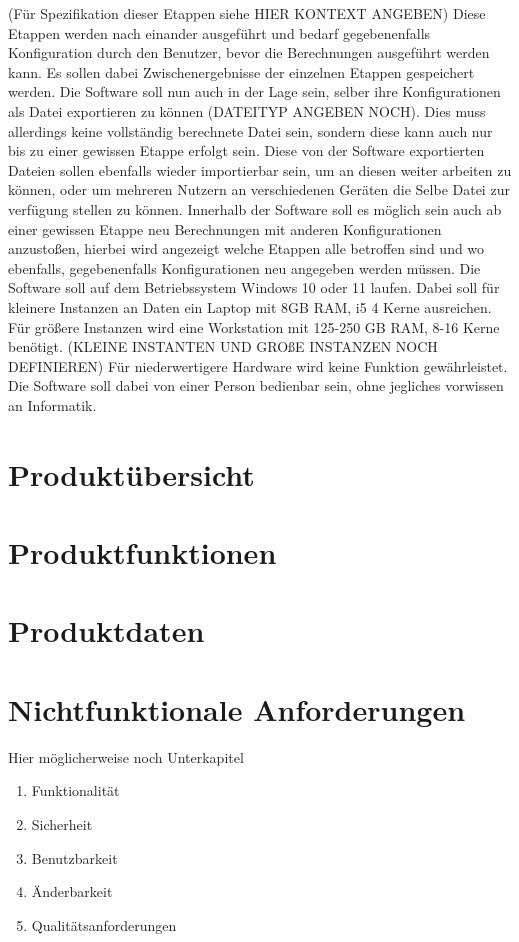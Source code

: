 \documentclass[parskip=full]{scrartcl} %
\begin{document}
(Für Spezifikation dieser Etappen siehe HIER KONTEXT ANGEBEN)
Diese Etappen werden nach einander ausgeführt und bedarf gegebenenfalls Konfiguration durch den Benutzer, bevor die Berechnungen ausgeführt werden kann.
Es sollen dabei Zwischenergebnisse der einzelnen Etappen gespeichert werden.
Die Software soll nun auch in der Lage sein, selber ihre Konfigurationen als Datei exportieren zu können (DATEITYP ANGEBEN NOCH). Dies muss allerdings keine vollständig berechnete Datei sein, sondern diese kann auch nur bis zu einer gewissen Etappe erfolgt sein.
Diese von der Software exportierten Dateien sollen ebenfalls wieder importierbar sein, um an diesen weiter arbeiten zu können, oder um mehreren Nutzern an verschiedenen Geräten die Selbe Datei zur verfügung stellen zu können.
Innerhalb der Software soll es möglich sein auch ab einer gewissen Etappe neu Berechnungen mit anderen Konfigurationen anzustoßen, hierbei wird angezeigt welche Etappen alle betroffen sind und wo ebenfalls, gegebenenfalls Konfigurationen neu angegeben werden müssen.
Die Software soll auf dem Betriebssystem Windows 10 oder 11 laufen.
Dabei soll für kleinere Instanzen an Daten ein Laptop mit 8GB RAM, i5 4 Kerne ausreichen.
Für größere Instanzen wird eine Workstation mit 125-250 GB RAM, 8-16 Kerne benötigt.
(KLEINE INSTANTEN UND GROßE INSTANZEN NOCH DEFINIEREN)
Für niederwertigere Hardware wird keine Funktion gewährleistet.
Die Software soll dabei von einer Person bedienbar sein, ohne jegliches vorwissen an Informatik.

\newpage



\section{Produktübersicht}
\newpage



\section{Produktfunktionen}
\newpage



\section{Produktdaten}
\newpage



\section{Nichtfunktionale Anforderungen}
Hier möglicherweise noch Unterkapitel
\begin{enumerate}
    \item Funktionalität
    \item Sicherheit
    \item Benutzbarkeit
    \item Änderbarkeit
    \item Qualitätsanforderungen
\end{enumerate}
\newpage
\end{document}
